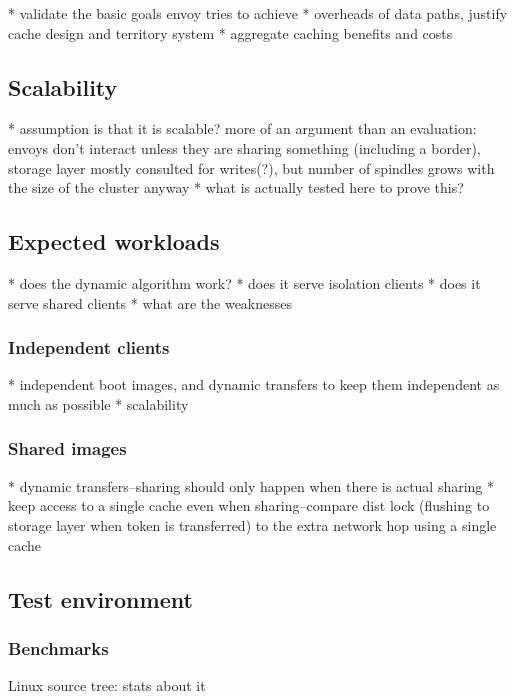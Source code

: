 * validate the basic goals envoy tries to achieve
* overheads of data paths, justify cache design and territory system
* aggregate caching benefits and costs

\subsection{Scalability}

* assumption is that it is scalable?  more of an argument than an evaluation: envoys don't interact unless they are sharing something (including a border), storage layer mostly consulted for writes(?), but number of spindles grows with the size of the cluster anyway
* what is actually tested here to prove this?

\subsection{Expected workloads}

* does the dynamic algorithm work?
* does it serve isolation clients
* does it serve shared clients
* what are the weaknesses

\subsubsection{Independent clients}

* independent boot images, and dynamic transfers to keep them independent as much as possible
* scalability

\subsubsection{Shared images}

* dynamic transfers--sharing should only happen when there is actual sharing
* keep access to a single cache even when sharing--compare dist lock (flushing to storage layer when token is transferred) to the extra network hop using a single cache

\subsection{Test environment}

\subsubsection{Benchmarks}

Linux source tree: stats about it

